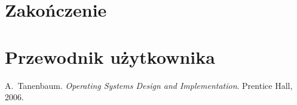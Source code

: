 \documentclass[11pt,a4paper,polish,thesis]{dcsbook}
\begin{document}
\chapter{Zakończenie}

\appendix

\chapter{Przewodnik użytkownika}

\backmatter

\begin{thebibliography}{1}
A.~Tanenbaum. \emph{Operating Systems Design and Implementation}. Prentice Hall, 2006.
\end{thebibliography}
\end{document}

